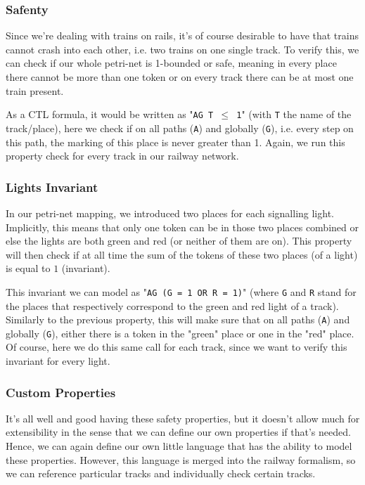 \documentclass{article}
\begin{document}
\subsubsection{Safenty}

Since we're dealing with trains on rails, it's of course desirable to have that trains cannot crash into each other, i.e. two trains on one single track. To verify this, we can check if our whole petri-net is 1-bounded or safe, meaning in every place there cannot be more than one token or on every track there can be at most one train present.

As a CTL formula, it would be written as "\texttt{AG T $\leq$ 1}" (with \texttt{T} the name of the track/place), here we check if on all paths (\texttt{A}) and globally (\texttt{G}), i.e. every step on this path, the marking of this place is never greater than 1. Again, we run this property check for every track in our railway network.

\subsubsection{Lights Invariant}

In our petri-net mapping, we introduced two places for each signalling light. Implicitly, this means that only one token can be in those two places combined or else the lights are both green and red (or neither of them are on). This property will then check if at all time the sum of the tokens of these two places (of a light) is equal to $1$ (invariant).

This invariant we can model as "\texttt{AG (G = 1 OR R = 1)}" (where \texttt{G} and \texttt{R} stand for the places that respectively correspond to the green and red light of a track). Similarly to the previous property, this will make sure that on all paths (\texttt{A}) and globally (\texttt{G}), either there is a token in the "green" place or one in the "red" place. Of course, here we do this same call for each track, since we want to verify this invariant for every light.

\subsubsection{Custom Properties}

It's all well and good having these safety properties, but it doesn't allow much for extensibility in the sense that we can define our own properties if that's needed. Hence, we can again define our own little language that has the ability to model these properties. However, this language is merged into the railway formalism, so we can reference particular tracks and individually check certain tracks.
\end{document}
